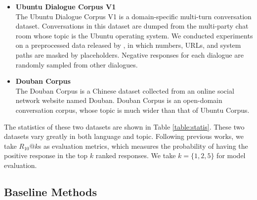 \documentclass[letterpaper]{article} \usepackage{aaai22}  \usepackage{times}  \usepackage{helvet}  \usepackage{courier}  \usepackage[hyphens]{url}  \usepackage{graphicx} \urlstyle{rm} \def\UrlFont{\rm}  \usepackage{natbib}  \usepackage{caption} \DeclareCaptionStyle{ruled}{labelfont=normalfont,labelsep=colon,strut=off} \frenchspacing  \setlength{\pdfpagewidth}{8.5in}  \setlength{\pdfpageheight}{11in}  \usepackage{algorithm}
\begin{document}
\begin{itemize}
    \item \textbf{Ubuntu Dialogue Corpus V1}\\ The Ubuntu Dialogue Corpus V1 \cite{lowe2015ubuntu} is a domain-specific multi-turn conversation dataset. Conversations in this dataset are dumped from the multi-party chat room whose topic is the Ubuntu operating system. We conducted experiments on a preprocessed data released by \citet{xu2019bert}, in which numbers, URLs, and system paths are masked by placeholders. Negative responses for each dialogue are randomly sampled from other dialogues.
    \item \textbf{Douban Corpus}\\ The Douban Corpus\cite{wu2016sequential} is a Chinese dataset collected from an online social network website named Douban. Douban Corpus is an open-domain conversation corpus, whose topic is much wider than that of Ubuntu Corpus.
\end{itemize}

The statistics of these two datasets are shown in Table \ref{table:statis}. These two datasets vary greatly in both language and topic. Following previous works, we take $R_{10}@k$s as evaluation metrics, which measures the probability of having the positive response in the top $k$ ranked responses. We take $k=\{1,2,5\}$ for model evaluation.

\begin{table}[h]
\centering
{}
\caption{Statistics of two datasets.}
\label{table:statis}
\end{table}

\subsection{Baseline Methods}
\end{document}
